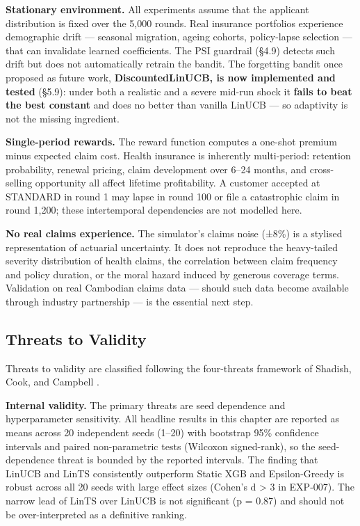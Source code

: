 \textbf{Stationary environment.} All experiments assume that the applicant distribution is fixed over the 5,000 rounds. Real insurance portfolios experience demographic drift --- seasonal migration, ageing cohorts, policy-lapse selection --- that can invalidate learned coefficients. The PSI guardrail (§4.9) detects such drift but does not automatically retrain the bandit. The forgetting bandit once proposed as future work, \textbf{DiscountedLinUCB, is now implemented and tested} (§5.9): under both a realistic and a severe mid-run shock it \textbf{fails to beat the best constant} and does no better than vanilla LinUCB --- so adaptivity is not the missing ingredient.

\textbf{Single-period rewards.} The reward function computes a one-shot premium minus expected claim cost. Health insurance is inherently multi-period: retention probability, renewal pricing, claim development over 6--24 months, and cross-selling opportunity all affect lifetime profitability. A customer accepted at STANDARD in round 1 may lapse in round 100 or file a catastrophic claim in round 1,200; these intertemporal dependencies are not modelled here.

\textbf{No real claims experience.} The simulator's claims noise (±8\%) is a stylised representation of actuarial uncertainty. It does not reproduce the heavy-tailed severity distribution of health claims, the correlation between claim frequency and policy duration, or the moral hazard induced by generous coverage terms. Validation on real Cambodian claims data --- should such data become available through industry partnership --- is the essential next step.

\subsection{Threats to Validity}\label{threats-to-validity}

Threats to validity are classified following the four-threats framework of Shadish, Cook, and Campbell \citeyearpar{Shadish2002}.

\textbf{Internal validity.} The primary threats are seed dependence and hyperparameter sensitivity. All headline results in this chapter are reported as means across 20 independent seeds (1--20) with bootstrap 95\% confidence intervals and paired non-parametric tests (Wilcoxon signed-rank), so the seed-dependence threat is bounded by the reported intervals. The finding that LinUCB and LinTS consistently outperform Static XGB and Epsilon-Greedy is robust across all 20 seeds with large effect sizes (Cohen's d \textgreater{} 3 in EXP-007). The narrow lead of LinTS over LinUCB is not significant (p = 0.87) and should not be over-interpreted as a definitive ranking.

